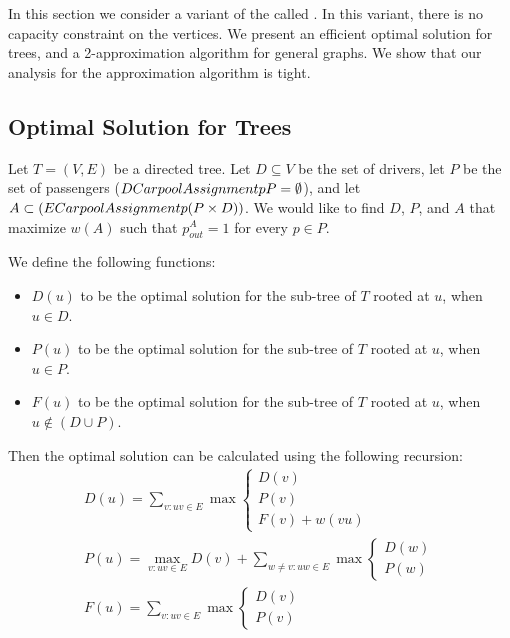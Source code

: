 \section{\uca{}}
\label{sec:uca}
In this section we consider a variant of the \ca{} called \uca{}.
In this variant, there is no capacity constraint on the vertices.
We present an efficient optimal solution for trees,
and a 2-approximation algorithm for general graphs.
We show that our analysis for the approximation algorithm is tight.

\subsection{Optimal Solution for Trees}
Let $T = (V, E)$ be a directed tree.
Let $D \subseteq V$ be the set of drivers, let $P$ be the
set of passengers ($D Carpool Assignment{}p P = \emptyset$), 
and let $A \subset (E Carpool Assignment{}p (P \times D))$.
We would like to find $D$, $P$, and $A$ that maximize $w(A)$ such that
$p^A_{out} = 1$ for every $p \in P$.

We define the following functions:
\begin{itemize}
  \item $D(u)$ to be the optimal solution for the sub-tree of $T$ rooted at $u$,
  when $u \in D$.
  \item $P(u)$ to be the optimal solution for the sub-tree of $T$ rooted at
  $u$, when $u \in P$. 
  \item $F(u)$ to be the optimal solution for the sub-tree of $T$ rooted at
  $u$, when $u \notin (D \cup P)$.
\end{itemize}

Then the optimal solution can be calculated using the following
recursion:
\begin{align*}
%
D(u) = \sum_{v : uv \in E}{
\max \begin{cases}
D(v)		\\
P(v)		\\
F(v) + w(vu)
\end{cases}
}
\\
P(u) = \max_{v : uv \in E}{
D(v) + \sum_{w \neq v : uw \in E}{
\max  \begin{cases}
D(w)		\\
P(w)
\end{cases}
}
}
\\
F(u) =  \sum_{v : uv \in E}{
\max \begin{cases}
D(v)		\\
P(v)		
\end{cases}
}
%
\end{align*}

